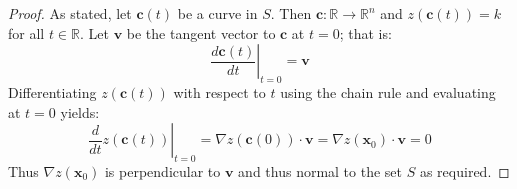 \begin{proof} As stated, let $\mathbf{c}(t)$ be a curve in $S$. Then $\mathbf{c}:\mathbb{R} \rightarrow \mathbb{R}^n$ and $z(\mathbf{c}(t) ) = k$ for all $t \in \mathbb{R}$. Let $\mathbf{v}$ be the tangent vector to $\mathbf{c}$ at $t = 0$; that is:
\begin{equation}
\left.\frac{d\mathbf{c}(t)}{dt}\right|_{t=0} = \mathbf{v}
\end{equation}
Differentiating $z(\mathbf{c}(t))$ with respect to $t$ using the chain rule and evaluating at $t = 0$ yields:
\begin{equation}
\left.\frac{d}{dt}z(\mathbf{c}(t))\right|_{t=0} = \nabla z(\mathbf{c}(0))\cdot\mathbf{v} = \nabla z(\mathbf{x}_0) \cdot \mathbf{v} = 0
\end{equation}
Thus $\nabla z(\mathbf{x}_0)$ is perpendicular to $\mathbf{v}$ and thus normal to the set $S$ as required.
\end{proof}

